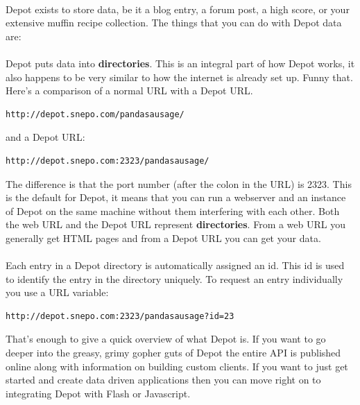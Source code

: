 \documentclass{report}
\begin{document}
\paragraph{}
Depot exists to store data, be it a blog entry, a forum post, a high
score, or your extensive muffin recipe collection. The things that you
can do with Depot data are: 


\paragraph{}
Depot puts data into \textbf{directories}. This is an integral part of
how Depot works, it also happens to be very similar to how the
internet is already set up. Funny that. Here's a comparison of a
normal URL with a Depot URL.
\begin{verbatim}
http://depot.snepo.com/pandasausage/
\end{verbatim}
and a Depot URL:
\begin{verbatim}
http://depot.snepo.com:2323/pandasausage/
\end{verbatim}
The difference is that the port number (after the colon in the URL) is
2323. This is the default for Depot, it means that you can run a
webserver and an instance of Depot on the same machine without them
interfering with each other. Both the web URL and the Depot URL
represent \textbf{directories}. From a web URL you generally get HTML
pages and from a Depot URL you can get your data.
\paragraph{}
Each entry in a Depot directory is automatically assigned an id. This
id is used to identify the entry in the directory uniquely. To request
an entry individually you use a URL variable:
\begin{verbatim}
http://depot.snepo.com:2323/pandasausage?id=23
\end{verbatim}

That's enough to give a quick overview of what Depot is. If you want
to go deeper into the greasy, grimy gopher guts of Depot the entire
API is published online along with information on building custom
clients. If you want to just get started and create data driven
applications then you can move right on to integrating Depot with
Flash or Javascript.
\end{document}

